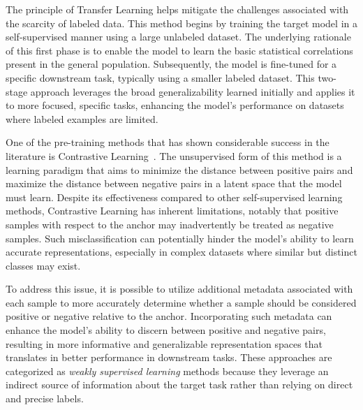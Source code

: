 The principle of Transfer Learning helps mitigate the challenges associated with
the scarcity of labeled data. This method begins by training the target model in
a self-supervised manner using a large unlabeled dataset. The underlying rationale of
this first phase is to enable the model to learn the basic statistical
correlations present in the general population.
Subsequently, the model is fine-tuned for a specific downstream
task,
typically using a smaller labeled dataset. This two-stage approach leverages the
broad generalizability learned initially and applies it to more focused,
specific tasks, enhancing the model's performance on datasets where labeled
examples are limited.

One of the pre-training methods that has shown considerable success in the
literature is Contrastive Learning~\cite{hadsell_dimred_2005,
chen_self_contrastive_2020, khosla_supervised_contrastive_2021,
henaff_contrastive_2020, hjelm_contrastive_2019, wu_unsupervised_2018}. The
unsupervised form of this method is a learning paradigm that aims to minimize
the distance between positive pairs and maximize the
distance between negative pairs in a latent space that the model must learn.
Despite its effectiveness compared to other self-supervised learning methods,
Contrastive Learning has inherent limitations, notably that positive samples
with respect to the anchor may inadvertently be treated as negative samples.
Such misclassification can potentially hinder the model's ability to learn
accurate representations, especially in complex datasets where similar but
distinct classes may exist.

To address this issue, it is possible to utilize additional metadata associated
with each sample to more accurately determine whether a sample should
be considered positive or negative relative to the anchor. Incorporating such
metadata can enhance the model's ability to discern between positive and
negative pairs, resulting in more informative and generalizable representation
spaces that translates in better performance in downstream tasks. These
approaches are categorized as \emph{weakly supervised learning} methods because
they leverage an indirect source of information about the target task rather
than relying on direct and precise labels.

